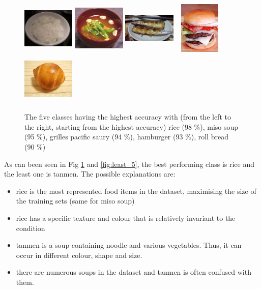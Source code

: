 \begin{figure}
    \centering
    \includegraphics[height=2.5cm, width=2.5cm]{img/top_rice.jpg}
    \includegraphics[height=2.5cm, width=2.5cm]{img/top_miso_soup.jpg}
    \includegraphics[height=2.5cm, width=2.5cm]{img/top_grilled_pacific_saury.jpg}
    \includegraphics[height=2.5cm, width=2.5cm]{img/top_hamburger.jpg}
    \includegraphics[height=2.5cm, width=2.5cm]{img/top_roll_bread.jpg}
    \caption[Classes having the highest accuracy]{The five classes having the highest accuracy with (from the left to the right, starting from the highest accuracy) rice (98 \%), miso soup (95 \%), grilles pacific saury (94 \%), hamburger (93 \%), roll bread (90 \%)}
    \label{fig:top_5}
\end{figure}

As can been seen in Fig \ref{fig:top_5} and \ref{fig:least_5}, the best performing class is rice and the least one is tanmen. The possible explanations are:
\begin{itemize}
    \item rice is the most represented food items in the dataset, maximising the size of the training sets (same for miso soup)
    \item rice has a specific texture and colour that is relatively invariant to the condition
    \item tanmen is a soup containing noodle and various vegetables. Thus, it can occur in different colour, shape and size.
    \item there are numerous soups in the dataset and tanmen is often confused with them.
\end{itemize}

